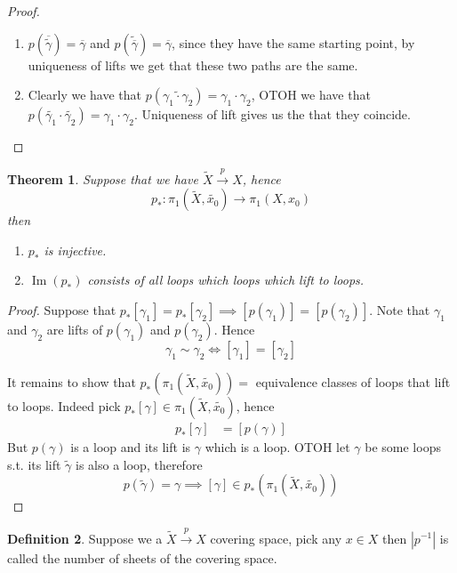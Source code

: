 \documentclass[11pt,a4paper]{article}
\theoremstyle{definition}
\newtheorem{definition}{Definition}[section]
\theoremstyle{plain}
\newtheorem{theorem}[definition]{Theorem}
\theoremstyle{remark}
\newcommand{\1}{\mathbbm{1}}
\begin{document}
\begin{proof}
   \begin{enumerate}
    \item $p(\overline{\tilde{\gamma}}) = \overline{\gamma}$ and $p(\tilde{\overline{\gamma}}) = \overline{\gamma}$, 
    since they have the same starting point, by uniqueness of lifts we get that these two paths are the same. 

    \item Clearly we have that $p(\tilde{\gamma_1 \cdot \gamma_2}) = \gamma_1 \cdot \gamma_2$, OTOH we have that 
    $p(\tilde{\gamma_1} \cdot \tilde{\gamma_2}) = \gamma_1 \cdot \gamma_2$. Uniqueness of lift gives us the that they coincide.  
   \end{enumerate} 
\end{proof}

\begin{theorem}
    Suppose that we have $\tilde{X} \xrightarrow{p} X$, hence 
    $$p_* \colon \pi_1(\tilde{X},\tilde{x_0}) \to \pi_1(X, x_0)$$
    then 
    \begin{enumerate}
        \item $p_*$ is injective. 
        \item $\operatorname{Im} (p_*)$ consists of all loops which loops which lift to loops.
    \end{enumerate}
\end{theorem}

\begin{proof}
    Suppose that $p_*[\gamma_1] = p_*[\gamma_2] \implies [p(\gamma_1)] = [p(\gamma_2)]$. Note that 
    $\gamma_1$ and $\gamma_2$ are lifts of $p(\gamma_1)$ and $p(\gamma_2)$. Hence 
    $$\gamma_1 \sim \gamma_2 \iff [\gamma_1] = [\gamma_2]$$

    It remains to show that $p_*(\pi_1(\tilde{X}, \tilde{x_0})) = $ equivalence classes of loops that lift to loops. 
    Indeed pick $p_*[\gamma] \in \pi_1(\tilde{X}, \tilde{x_0})$, hence 
    \begin{align*}
        p_*[\gamma] &= [p(\gamma)] 
    \end{align*}
    But $p(\gamma)$ is a loop and its lift is $\gamma$ which is a loop. OTOH let $\gamma$ be some loops s.t. 
    its lift $\tilde{\gamma}$ is also a loop, therefore 
    $$p(\tilde{\gamma}) = \gamma \implies [\gamma] \in p_*(\pi_1(\tilde{X}, \tilde{x_0}))$$
\end{proof}

\begin{definition}
    Suppose we a $\tilde{X} \xrightarrow{p} X$ covering space, pick any $x\in X$ then 
    $|p^{-1}|$ is called the number of sheets of the covering space.    
\end{definition}
\end{document}
